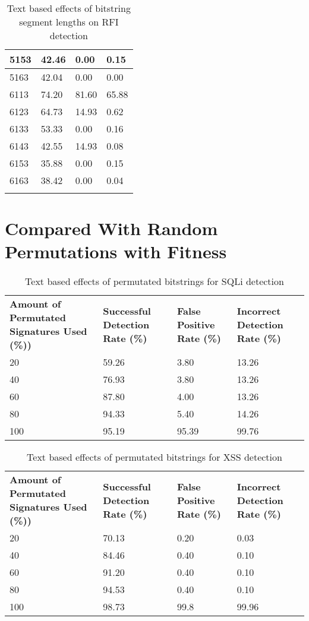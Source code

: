 \begin{appendices}
\begin{longtable}{|p{1.5in}|p{1in}|p{1in}|p{1in}|}
	5153 &  42.46 &   0.00 &  0.15 \\ \hline
	5163 &  42.04 &   0.00 &  0.00 \\ \hline
	6113 &  74.20 &  81.60 & 65.88 \\ \hline
	6123 &  64.73 &  14.93 &  0.62 \\ \hline
	6133 &  53.33 &   0.00 &  0.16 \\ \hline
	6143 &  42.55 &  14.93 &  0.08 \\ \hline
	6153 &  35.88 &   0.00 &  0.15 \\ \hline
	6163 &  38.42 &   0.00 &  0.04 \\ \hline
	\caption[]{Text based effects of bitstring segment lengths on RFI detection}
	\label{app:rfiBitstringTest}
\end{longtable}

\newpage
\section{Compared With Random Permutations with Fitness}

\begin{table}[H]
	\centering
	\begin{tabular}{|p{1.5in}|p{1in}|p{1in}|p{1in}|}
	\hline
	\textbf{Amount of Permutated Signatures Used (\%))} & \textbf{Successful Detection Rate (\%)} & \textbf{False Positive Rate (\%)} & \textbf{Incorrect Detection Rate (\%)}  \\
	\hhline{|=|=|=|=|}
	20	& 59.26	& 3.80 & 13.26 \\ \hline
	40	& 76.93 & 3.80 & 13.26 \\ \hline
	60	& 87.80	& 4.00 & 13.26 \\ \hline
	80	& 94.33 & 5.40 & 14.26 \\ \hline
	100	& 95.19 & 95.39 & 99.76 \\ \hline
	\end{tabular}
	\caption[]{Text based effects of permutated bitstrings for SQLi detection}
	\label{app:sqlRandomText}
\end{table}

\begin{table}[H]
	\centering
	\begin{tabular}{|p{1.5in}|p{1in}|p{1in}|p{1in}|}
	\hline
	\textbf{Amount of Permutated Signatures Used (\%))} & \textbf{Successful Detection Rate (\%)} & \textbf{False Positive Rate (\%)} & \textbf{Incorrect Detection Rate (\%)}  \\
	\hhline{|=|=|=|=|}
	20	& 70.13	& 0.20 &	0.03 \\ \hline
	40	& 84.46 & 0.40 &	0.10 \\ \hline
	60	& 91.20	& 0.40 &	0.10 \\ \hline
	80	& 94.53 & 0.40 & 0.10 \\ \hline
	100	& 98.73 & 99.8 & 99.96 \\ \hline
	\end{tabular}
	\caption[]{Text based effects of permutated bitstrings for XSS detection}
	\label{app:xssRandomText}
\end{table}


\end{appendices}

